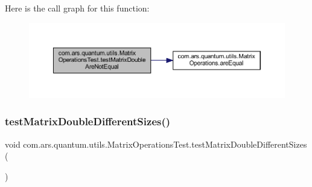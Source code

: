 Here is the call graph for this function\+:\nopagebreak
\begin{figure}[H]
\begin{center}
\leavevmode
\includegraphics[width=350pt]{classcom_1_1ars_1_1quantum_1_1utils_1_1_matrix_operations_test_ae47b404462da670081830dded82d3252_cgraph}
\end{center}
\end{figure}
\hypertarget{classcom_1_1ars_1_1quantum_1_1utils_1_1_matrix_operations_test_a2263b15fae56de8579bc572cd67a5db2}{}\label{classcom_1_1ars_1_1quantum_1_1utils_1_1_matrix_operations_test_a2263b15fae56de8579bc572cd67a5db2} 
\subsubsection{\texorpdfstring{test\+Matrix\+Double\+Different\+Sizes()}{testMatrixDoubleDifferentSizes()}}
{\footnotesize\ttfamily void com.\+ars.\+quantum.\+utils.\+Matrix\+Operations\+Test.\+test\+Matrix\+Double\+Different\+Sizes (\begin{DoxyParamCaption}{ }\end{DoxyParamCaption})}

